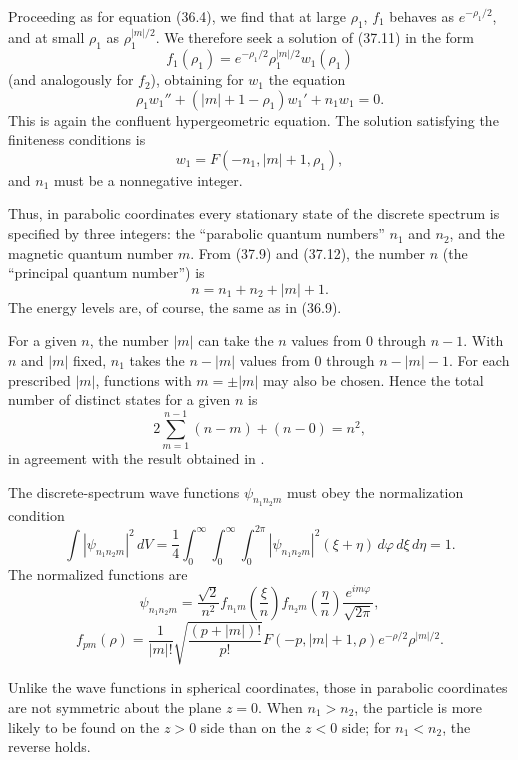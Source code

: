 Proceeding as for equation (36.4), we find that at large $\rho_1$, $f_1$
behaves as $e^{-\rho_1/2}$, and at small $\rho_1$ as
$\rho_1^{|m|/2}$. We therefore seek a solution of (37.11) in the form
\[
  f_1(\rho_1)=e^{-\rho_1/2}\rho_1^{|m|/2}w_1(\rho_1)
\]
(and analogously for $f_2$), obtaining for $w_1$ the equation
\[
  \rho_1w_1''+(|m|+1-\rho_1)w_1'+n_1w_1=0.
\]
This is again the confluent hypergeometric equation. The solution satisfying
the finiteness conditions is
\[
  w_1=F(-n_1,|m|+1,\rho_1),
\]
and $n_1$ must be a nonnegative integer.

Thus, in parabolic coordinates every stationary state of the discrete
spectrum is specified by three integers: the ``parabolic quantum numbers''
$n_1$ and $n_2$, and the magnetic quantum number $m$. From (37.9) and
(37.12), the number $n$ (the ``principal quantum number'') is
\begin{equation}
  n=n_1+n_2+|m|+1.
  \tag{37.13}
\end{equation}
The energy levels are, of course, the same as in (36.9).

For a given $n$, the number $|m|$ can take the $n$ values from 0 through
$n-1$. With $n$ and $|m|$ fixed, $n_1$ takes
the $n-|m|$ values from 0 through $n-|m|-1$. For each prescribed $|m|$,
functions with $m=\pm|m|$ may also be chosen. Hence the total number of
distinct states for a given $n$ is
\[
  2\sum_{m=1}^{n-1}(n-m)+(n-0)=n^2,
\]
in agreement with the result obtained in .

The discrete-spectrum wave functions $\psi_{n_1n_2m}$ must obey the
normalization condition
\begin{equation}
  \int|\psi_{n_1n_2m}|^2\,dV
  =\frac14\int_0^\infty\!\int_0^\infty\!\int_0^{2\pi}
   |\psi_{n_1n_2m}|^2(\xi+\eta)\,d\varphi\,d\xi\,d\eta=1.
  \tag{37.14}
\end{equation}
The normalized functions are
\begin{equation}
  \psi_{n_1n_2m}=\frac{\sqrt2}{n^2}
  f_{n_1m}\left(\frac\xi n\right)
  f_{n_2m}\left(\frac\eta n\right)
  \frac{e^{im\varphi}}{\sqrt{2\pi}},
  \tag{37.15}
\end{equation}
\begin{equation}
  f_{pm}(\rho)=\frac1{|m|!}\sqrt{\frac{(p+|m|)!}{p!}}
  F(-p,|m|+1,\rho)e^{-\rho/2}\rho^{|m|/2}.
  \tag{37.16}
\end{equation}

Unlike the wave functions in spherical coordinates, those in parabolic
coordinates are not symmetric about the plane $z=0$. When $n_1>n_2$, the
particle is more likely to be found on the $z>0$ side than on the $z<0$
side; for $n_1<n_2$, the reverse holds.


